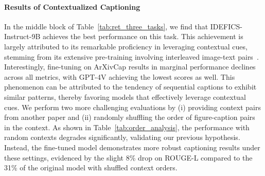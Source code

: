 \paragraph{Results of Contextualized Captioning}
In the middle block of Table~\ref{tab:ret_three_tasks}, we find that IDEFICS-Instruct-9B achieves the best performance on this task.
This achievement is largely attributed to its remarkable proficiency in leveraging contextual cues, stemming from its extensive pre-training involving interleaved image-text pairs~\citep{laurencon2023obelics}. 
Interestingly, fine-tuning on ArXivCap results in marginal performance declines across all metrics, with GPT-4V achieving the lowest scores as well. 
This phenomenon can be attributed to the tendency of sequential captions to exhibit similar patterns, thereby favoring models that effectively leverage contextual cues.
We perform two more challenging evaluations by (i) providing context pairs from another paper and (ii) randomly shuffling the order of figure-caption pairs in the context.
As shown in Table~\ref{tab:order_analysis}, 
the performance with random contexts degrades significantly, validating our previous hypothesis.
Instead, the fine-tuned model demonstrates more robust captioning results under these settings, evidenced by the slight 8\% drop on ROUGE-L compared to the 31\% of the original model with shuffled context orders.


\begin{table}[t!]
    \centering
    \caption{Contextualized captioning performance is influenced by the order. After tuning on the ArXivCap, the model is more robust to the order of the history captions.}
    \label{tab:order_analysis}
\end{table}
